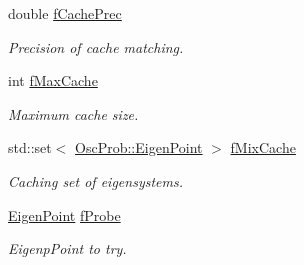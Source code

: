 \begin{DoxyCompactItemize}
double \hyperlink{classOscProb_1_1PMNS__Base_a0b4c41a27de281472453a1912cbc1e64}{f\+Cache\+Prec}
\begin{DoxyCompactList}\small\item\em Precision of cache matching. \end{DoxyCompactList}\item 
int \hyperlink{classOscProb_1_1PMNS__Base_a74c13356eafec2490d8c3c19759ba7f0}{f\+Max\+Cache}
\begin{DoxyCompactList}\small\item\em Maximum cache size. \end{DoxyCompactList}\item 
std\+::set$<$ \hyperlink{structOscProb_1_1EigenPoint}{Osc\+Prob\+::\+Eigen\+Point} $>$ \hyperlink{classOscProb_1_1PMNS__Base_a8159424f20197a3a7145fe3bf2c11176}{f\+Mix\+Cache}
\begin{DoxyCompactList}\small\item\em Caching set of eigensystems. \end{DoxyCompactList}\item 
\hyperlink{structOscProb_1_1EigenPoint}{Eigen\+Point} \hyperlink{classOscProb_1_1PMNS__Base_ab1fe4800ee3ae48df4fc942dce00e0d3}{f\+Probe}
\begin{DoxyCompactList}\small\item\em Eigenp\+Point to try. \end{DoxyCompactList}\end{DoxyCompactItemize}
